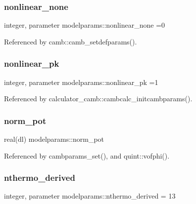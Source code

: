 \subsubsection{\texorpdfstring{nonlinear\+\_\+none}{nonlinear\_none}}
{\footnotesize\ttfamily integer, parameter modelparams\+::nonlinear\+\_\+none =0}



Referenced by camb\+::camb\+\_\+setdefparams().

\mbox{\label{namespacemodelparams_a7534d8ae818c3b810559177c3108c43c}} 
\subsubsection{\texorpdfstring{nonlinear\+\_\+pk}{nonlinear\_pk}}
{\footnotesize\ttfamily integer, parameter modelparams\+::nonlinear\+\_\+pk =1}



Referenced by calculator\+\_\+camb\+::cambcalc\+\_\+initcambparams().

\mbox{\label{namespacemodelparams_a616bd55af3f7197c74b52398020f9b85}} 
\subsubsection{\texorpdfstring{norm\+\_\+pot}{norm\_pot}}
{\footnotesize\ttfamily real(dl) modelparams\+::norm\+\_\+pot}



Referenced by cambparams\+\_\+set(), and quint\+::vofphi().

\mbox{\label{namespacemodelparams_a3763c4095d154f01def46dfce33faffd}} 
\subsubsection{\texorpdfstring{nthermo\+\_\+derived}{nthermo\_derived}}
{\footnotesize\ttfamily integer, parameter modelparams\+::nthermo\+\_\+derived = 13}


